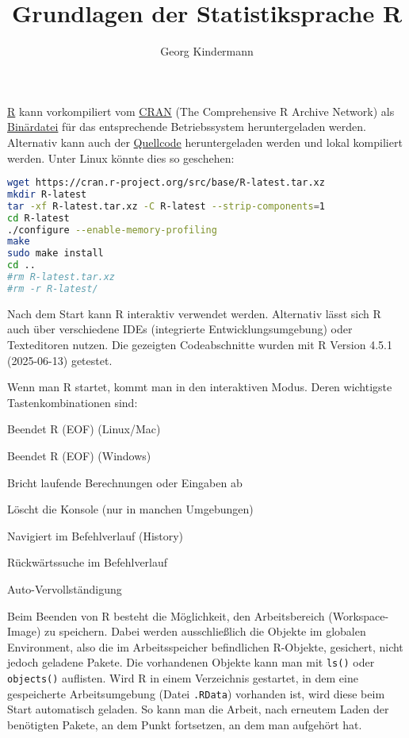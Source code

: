 \documentclass[10pt,twocolumn]{scrartcl}
\title{Grundlagen der Statistiksprache R}
\author{Georg Kindermann}
\begin{document}
\maketitle


\tableofcontents
\smallskip
\noindent
\href{https://www.r-project.org/}{R} kann vorkompiliert vom
\href{https://cran.r-project.org/}{CRAN} (The Comprehensive R Archive
Network) als \href{https://cran.r-project.org/bin/}{Binärdatei} für das
entsprechende Betriebssystem heruntergeladen werden. Alternativ kann
auch der \href{https://cran.r-project.org/src/base/R-4/}{Quellcode}
heruntergeladen werden und lokal kompiliert werden. Unter Linux
könnte dies so geschehen:

\begin{lstlisting}[language=sh]
wget https://cran.r-project.org/src/base/R-latest.tar.xz
mkdir R-latest
tar -xf R-latest.tar.xz -C R-latest --strip-components=1
cd R-latest
./configure --enable-memory-profiling
make
sudo make install
cd ..
#rm R-latest.tar.xz
#rm -r R-latest/
\end{lstlisting}

Nach dem Start kann R interaktiv verwendet werden. Alternativ lässt
sich R auch über verschiedene IDEs (integrierte Entwicklungsumgebung)
oder Texteditoren nutzen. Die gezeigten Codeabschnitte wurden mit R
Version 4.5.1 (2025-06-13) getestet.

Wenn man R startet, kommt man in den interaktiven Modus.
Deren wichtigste Tastenkombinationen sind:
\begin{description}[style=multiline,leftmargin=2cm,nolistsep]
  \item[CTRL+d] Beendet R (EOF) (Linux/Mac)
  \item[CTRL+z] Beendet R (EOF) (Windows)
  \item[CTRL+c] Bricht laufende Berechnungen oder Eingaben ab
  \item[CTRL+l] Löscht die Konsole (nur in manchen Umgebungen)
  \item[Pfeil ↑ / ↓] Navigiert im Befehlverlauf (History)
  \item[CTRL+r] Rückwärtssuche im Befehlverlauf
  \item[Tab] Auto-Vervollständigung
\end{description}

Beim Beenden von R besteht die Möglichkeit, den Arbeitsbereich (Workspace-Image) zu speichern. Dabei werden ausschließlich die Objekte im globalen Environment, also die im Arbeitsspeicher befindlichen R-Objekte, gesichert, nicht jedoch geladene Pakete. Die vorhandenen Objekte kann man mit \lstinline|ls()| oder \lstinline|objects()| auflisten. Wird R in einem Verzeichnis gestartet, in dem eine gespeicherte Arbeitsumgebung (Datei \lstinline|.RData|) vorhanden ist, wird diese beim Start automatisch geladen. So kann man die Arbeit, nach erneutem Laden der benötigten Pakete, an dem Punkt fortsetzen, an dem man aufgehört hat.
\end{document}
